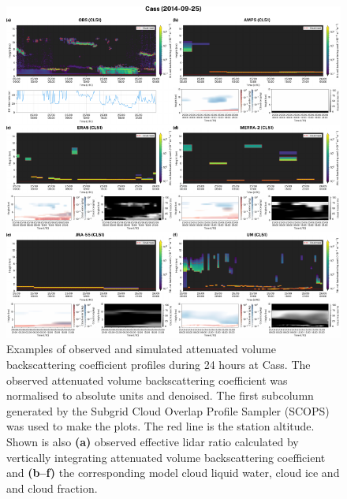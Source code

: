 \begin{figure}[p]
\centerline{\includegraphics[width=1.12\textwidth]{chapter3/fig/examples_rev2.pdf}}
\caption[Examples of observed and simulated attenuated volume backscattering coefficient profiles]{
Examples of observed and simulated attenuated volume backscattering coefficient profiles during 24 hours
at Cass. The observed attenuated volume backscattering coefficient
was normalised to absolute units and denoised. The first subcolumn
generated by the Subgrid Cloud Overlap Profile Sampler (SCOPS)
was used to make the plots. The red line is the station altitude.
Shown is also \textbf{(a)} observed effective lidar ratio calculated by vertically
integrating attenuated volume backscattering coefficient
and \textbf{(b--f)} the corresponding model cloud liquid water, cloud ice and and
cloud fraction.
}
\label{fig:3:examples}
\end{figure}

